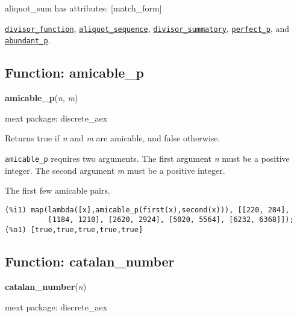 \documentclass[]{article}
\begin{document}
\vspace{5 pt}

aliquot\_sum has attributes: [match\_form]

\vspace{5 pt}


  \hyperlink{divisor_function}{{\tt divisor\_function}}, \hyperlink{aliquot_sequence}{{\tt aliquot\_sequence}}, \hyperlink{divisor_summatory}{{\tt divisor\_summatory}}, \hyperlink{perfect_p}{{\tt perfect\_p}}, and \hyperlink{abundant_p}{{\tt abundant\_p}}.

\vspace{5 pt}


\subsection{Function: amicable\_p\label{sec:amicable_p}}
\hypertarget{amicable_p}{}
{\bf amicable\_p}({\it n}, {\it m})


\noindent mext package: discrete\_aex



\vspace{5 pt}
Returns true if {\it n} and {\it m} are amicable, and false otherwise. 

\vspace{5 pt}

   {\tt amicable\_p} requires two arguments.
    The first argument {\it n} must be a positive integer.
    The second argument {\it m} must be a positive integer.


\vspace{5 pt}


   The first few amicable pairs. 

\begin{Verbatim}[frame=single]
(%i1) map(lambda([x],amicable_p(first(x),second(x))), [[220, 284], 
          [1184, 1210], [2620, 2924], [5020, 5564], [6232, 6368]]);
(%o1) [true,true,true,true,true]
\end{Verbatim}


\subsection{Function: catalan\_number\label{sec:catalan_number}}
\hypertarget{catalan_number}{}
{\bf catalan\_number}({\it n})


\noindent mext package: discrete\_aex
\end{document}
